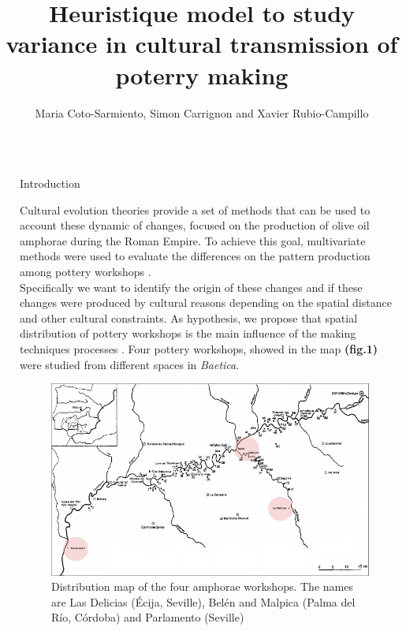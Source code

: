 \documentclass[final]{beamer}
\title{Heuristique model to study variance in cultural transmission of poterry making} %
\author{Maria Coto-Sarmiento, Simon Carrignon and Xavier Rubio-Campillo} %
\institute{Barcelona Supercomputing Center - University of Barcelona} %
\newlength{\sepwid}
\newlength{\onecolwid}
\begin{document}

\setlength{\belowcaptionskip}{2ex} %
\setlength\belowdisplayshortskip{2ex} %

\begin{frame}[t] %

\begin{columns}[t] %

\begin{column}{\sepwid}\end{column} %

\begin{column}{\onecolwid} %


\begin{block}{Introduction}

Cultural evolution theories \cite{mesoudi} provide a set of methods that can be used to account these dynamic of changes, focused on the production of olive oil amphorae during the Roman Empire. 
To achieve this goal, multivariate methods were used to evaluate the differences on the pattern production among pottery workshops \cite{agui}. \\
Specifically we want to identify the origin of these changes and if these changes were produced by cultural reasons depending on the spatial distance and other cultural constraints. As hypothesis, we propose that spatial distribution of pottery workshops is the main influence of the making techniques processes \cite{schillinger}. Four pottery workshops, showed in the map \textbf{(fig.1)} were studied from different spaces in \emph{Baetica}. 
\end{block}

\begin{figure}
\includegraphics[width=0.6\linewidth]{images/fig1.png}
\caption{Distribution map of the four amphorae workshops. The names  are Las Delicias (\'Ecija, Seville), Bel\'en and Malpica (Palma del R\'io, C\'ordoba) and Parlamento (Seville)}
\end{figure}



\end{column}
\end{columns}
\end{frame}
\end{document}
